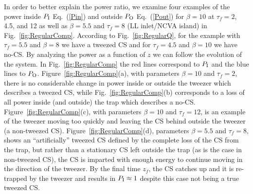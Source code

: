 \documentclass[aps,floatfix,showpacs,preprintnumbers,twocolumn,nofootinbib]{revtex4}
\begin{document}
In order to better explain the power ratio, we examine four examples of the power inside $P_{\rm I}$ Eq.~(\ref{Pin}) and outside $P_{\rm O}$ Eq.~(\ref{Pout}) for $\beta = 10$ at $\tau_f = 2$, 4.5, and 12 as well as $\beta = 5.5$ and $\tau_f = 8$ (LL inlet/NCVA island) in Fig.~\ref{fig:RegularComp}.  According to Fig.~\ref{fig:RegularQ}, for the example with $\tau_f = 5.5$ and $\beta=8$ we have a tweezed CS and for $\tau_f=4.5$ and $\beta = 10$ we have no-CS.   By analyzing the power as a function of $z$ we can follow the evolution of the system.  In Fig.~\ref{fig:RegularComp} the red lines correspond to $P_{\rm I}$ and the blue lines to $P_{\rm O}$.  Figure~\ref{fig:RegularComp}(a), with parameters $\beta = 10$ and $\tau_f = 2$, there is no considerable change in power inside or outside the tweezer which describes a tweezed CS, while Fig.~\ref{fig:RegularComp}(b) corresponds to a loss of all power inside (and outside) the trap which describes a no-CS.  Figure~\ref{fig:RegularComp}(c), with parameters $\beta = 10$ and $\tau_f = 12$, is an example of the tweezer moving too quickly and leaving the CS behind outside the tweezer (a non-tweezed CS).  Figure~\ref{fig:RegularComp}(d), parameters $\beta = 5.5$ and $\tau_f = 8$, shows an ``artificially'' tweezed CS defined by the complete loss of the CS from the trap, but rather than a stationary CS left outside the trap (as is the case in non-tweezed CS), the CS is imparted with enough energy to continue moving in the direction of the tweezer.  By the final time $z_f$, the CS catches up and it is re-trapped by the tweezer and results in $P_{\rm I} \approx 1$ despite this case not being a true tweezed CS. 
\end{document}
